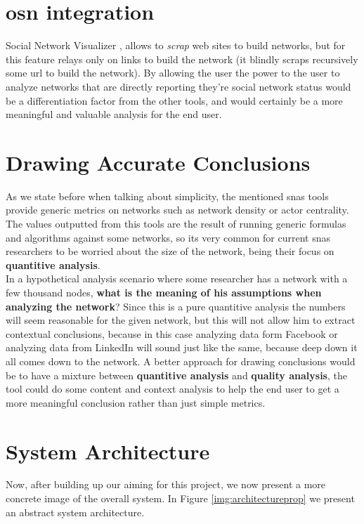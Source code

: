 \section{\acrfull{osn} integration}
Social Network Visualizer \cite{socnetv}, allows to \textit{scrap} web sites to build networks, but for this feature relays only on links to build the network (it blindly scraps recursively some url to build the network). By allowing the user the power to the user to analyze networks that are directly reporting they're social network status would be a differentiation factor from the other tools, and would certainly be a more meaningful and valuable analysis for the end user.

\section{Drawing Accurate Conclusions}
As we state before when talking about simplicity, the mentioned \glspl{sna} tools provide generic metrics on networks such as network density or actor centrality. The values outputted from this tools are the result of running generic formulas and algorithms against some networks, so its very common for current \glspl{sna} researchers to be worried about the size of the network, being their focus on \textbf{quantitive analysis}.\\
\indent In a hypothetical analysis scenario where some researcher has a network with a few thousand nodes, \textbf{what is the meaning of his assumptions when analyzing the network}? Since this is a pure quantitive analysis the numbers will seem reasonable for the given network, but this will not allow him to extract contextual conclusions, because in this case analyzing data form Facebook or analyzing data from LinkedIn will sound just like the same, because deep down it all comes down to the network. A better approach for drawing conclusions would be to have a mixture between \textbf{quantitive analysis} and \textbf{quality analysis}, the tool could do some content and context analysis to help the end user to get a more meaningful conclusion rather than just simple metrics.

\section{System Architecture}

Now, after building up our aiming for this project, we now present a more concrete image of the overall system. In Figure \ref{img:architectureprop} we present an abstract system architecture.

